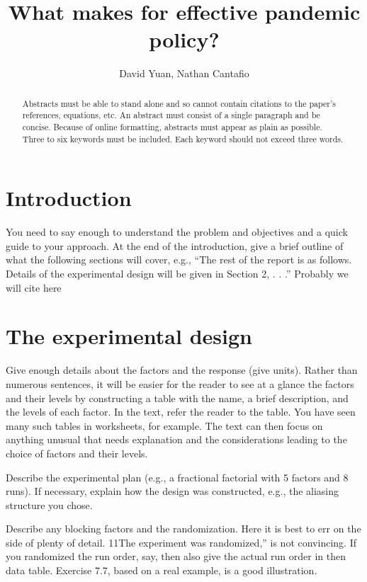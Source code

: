 \documentclass[12pt,a4paper]{article}
\title{What makes for effective pandemic policy?}
\author{David Yuan, Nathan Cantafio}
\date{}  %
\begin{document}
\maketitle

\begin{abstract}
Abstracts must be able to stand alone and so cannot contain citations to the paper’s references, equations, etc. An abstract must consist of a single paragraph and be concise. Because of online formatting, abstracts must appear as plain as possible. Three to six keywords must be included. Each keyword should not exceed three words. %
\end{abstract} 

\section{Introduction}

You need to say enough to understand the problem and objectives and a
quick guide to your approach. At the end of the introduction, give a brief outline of what
the following sections will cover, e.g., ``The rest of the report is as follows. Details of the
experimental design will be given in Section 2, . . .''
Probably we will cite here
\cite{TURKYILMAZOGLU2022127429} %

\section{The experimental design}
Give enough details about the factors and the
response (give units). Rather than numerous sentences, it will be easier for the reader
to see at a glance the factors and their levels by constructing a table with the name, a
brief description, and the levels of each factor. In the text, refer the reader to the table.
You have seen many such tables in worksheets, for example. The text can then focus on
anything unusual that needs explanation and the considerations leading to the choice of
factors and their levels.

Describe the experimental plan (e.g., a fractional factorial with 5 factors and 8 runs). If
necessary, explain how the design was constructed, e.g., the aliasing structure you chose.

Describe any blocking factors and the randomization. Here it is best to err on the side of
plenty of detail. 11The experiment was randomized,'' is not convincing. If you randomized
the run order, say, then also give the actual run order in then data table. Exercise 7.7,
based on a real example, is a good illustration.
\end{document}
